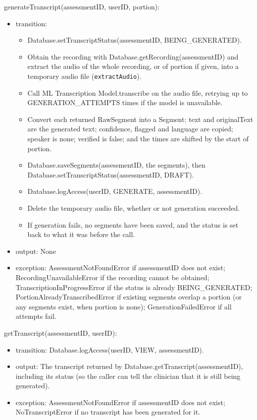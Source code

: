 \documentclass[12pt, titlepage]{article}
\begin{document}
\noindent generateTranscript(assessmentID, userID, portion):
\begin{itemize}
\item transition:
  \begin{itemize}
  \item Database.setTranscriptStatus(assessmentID, BEING\_GENERATED).
  \item Obtain the recording with Database.getRecording(assessmentID) and extract the audio of the whole recording, or of portion if given, into a temporary audio file (\texttt{extractAudio}).
  \item Call ML Transcription Model.transcribe on the audio file, retrying up to GENERATION\_ATTEMPTS times if the model is unavailable.
  \item Convert each returned RawSegment into a Segment: text and originalText are the generated text; confidence, flagged and language are copied; speaker is none; verified is false; and the times are shifted by the start of portion.
  \item Database.saveSegments(assessmentID, the segments), then \\Database.setTranscriptStatus(assessmentID, DRAFT).
  \item Database.logAccess(userID, GENERATE, assessmentID).
  \item Delete the temporary audio file, whether or not generation succeeded.
  \item If generation fails, no segments have been saved, and the status is set back to what it was before the call.
  \end{itemize}
\item output: None
\item exception: AssessmentNotFoundError if assessmentID does not exist; RecordingUnavailableError if the recording cannot be obtained; TranscriptionInProgressError if the status is already BEING\_GENERATED; PortionAlreadyTranscribedError if existing segments overlap a portion (or any segments exist, when portion is none); GenerationFailedError if all attempts fail.
\end{itemize}

\noindent getTranscript(assessmentID, userID):
\begin{itemize}
\item transition: Database.logAccess(userID, VIEW, assessmentID).
\item output: The transcript returned by Database.getTranscript(assessmentID), including its status (so the caller can tell the clinician that it is still being generated).
\item exception: AssessmentNotFoundError if assessmentID does not exist; NoTranscriptError if no transcript has been generated for it.
\end{itemize}
\end{document}
